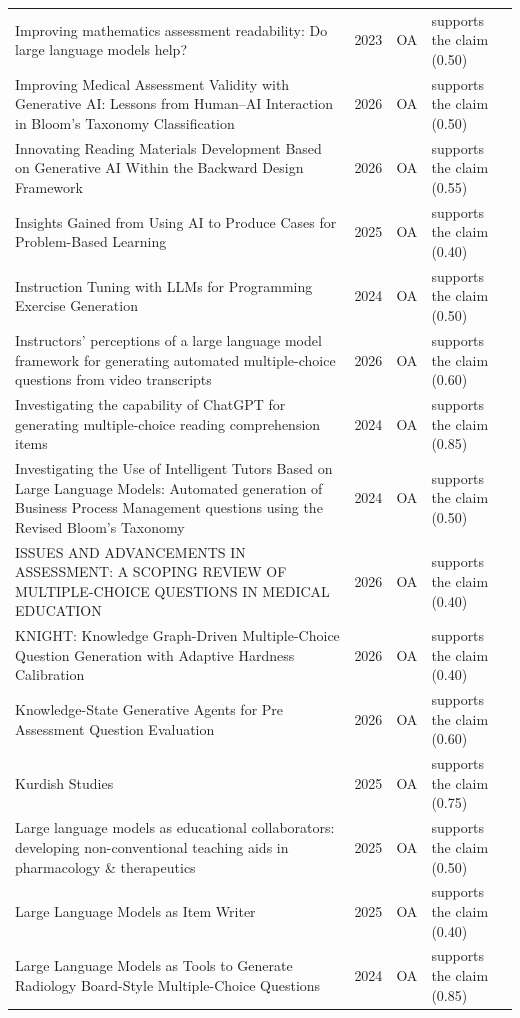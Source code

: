 \begin{longtable}{@{}%
  >{\raggedright\arraybackslash}p{}c%
  >{\raggedright\arraybackslash}p{}%
  >{\raggedright\arraybackslash}p{}@{}}
Improving mathematics assessment readability: Do large language models help? & 2023 & OA & supports the claim (0.50) \\
Improving Medical Assessment Validity with Generative AI: Lessons from Human--AI Interaction in Bloom's Taxonomy Classification & 2026 & OA & supports the claim (0.50) \\
Innovating Reading Materials Development Based on Generative AI Within the Backward Design Framework & 2026 & OA & supports the claim (0.55) \\
Insights Gained from Using AI to Produce Cases for Problem-Based Learning & 2025 & OA & supports the claim (0.40) \\
Instruction Tuning with LLMs for Programming Exercise Generation & 2024 & OA & supports the claim (0.50) \\
Instructors' perceptions of a large language model framework for generating automated multiple-choice questions from video transcripts & 2026 & OA & supports the claim (0.60) \\
Investigating the capability of ChatGPT for generating multiple-choice reading comprehension items & 2024 & OA & supports the claim (0.85) \\
Investigating the Use of Intelligent Tutors Based on Large Language Models: Automated generation of Business Process Management questions using the Revised Bloom's Taxonomy & 2024 & OA & supports the claim (0.50) \\
ISSUES AND ADVANCEMENTS IN ASSESSMENT: A SCOPING REVIEW OF MULTIPLE-CHOICE QUESTIONS IN MEDICAL EDUCATION & 2026 & OA & supports the claim (0.40) \\
KNIGHT: Knowledge Graph-Driven Multiple-Choice Question Generation with Adaptive Hardness Calibration & 2026 & OA & supports the claim (0.40) \\
Knowledge-State Generative Agents for Pre Assessment Question Evaluation & 2026 & OA & supports the claim (0.60) \\
Kurdish Studies & 2025 & OA & supports the claim (0.75) \\
Large language models as educational collaborators: developing non-conventional teaching aids in pharmacology \& therapeutics & 2025 & OA & supports the claim (0.50) \\
Large Language Models as Item Writer & 2025 & OA & supports the claim (0.40) \\
Large Language Models as Tools to Generate Radiology Board-Style Multiple-Choice Questions & 2024 & OA & supports the claim (0.85) \\

\end{longtable}
